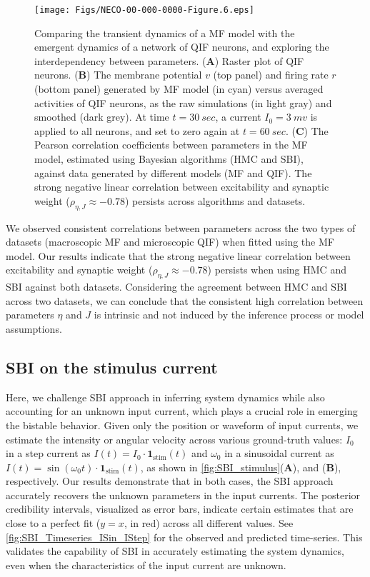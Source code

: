 \documentclass[12pt]{article}
\begin{document}
\begin{figure}
     \centering
     \texttt{[image: Figs/NECO-00-000-0000-Figure.6.eps]}
     \caption{Comparing the transient dynamics of a MF model with the emergent dynamics of a network of QIF neurons, and exploring the interdependency between parameters. (\textbf{A}) Raster plot of QIF neurons. (\textbf{B}) The membrane potential $v$ (top panel) and firing rate $r$ (bottom panel) generated by MF model (in cyan) versus averaged activities of QIF neurons, as the raw simulations (in light gray) and smoothed (dark grey). At time $t=30~sec$, a current $I_0=3~ mv$ is applied to all neurons, and set to zero again at $t=60~sec$. (\textbf{C}) The Pearson correlation coefficients between parameters in the MF model, estimated using Bayesian algorithms (HMC and SBI), against data generated by different models (MF and QIF). The strong negative linear correlation between excitability and synaptic weight ($\rho_{\eta, J} \approx -0.78$) persists across algorithms and datasets.}
     \label{fig:QIF_correlations}
 \end{figure}
 
We observed consistent correlations between parameters across the two types of datasets (macroscopic MF and microscopic QIF) when fitted using the MF model. Our results indicate that the strong negative linear correlation between excitability and synaptic weight ($\rho_{\eta, J} \approx -0.78$) persists when using HMC and SBI against both datasets. Considering the agreement between HMC and SBI across two datasets, we can conclude that the consistent high correlation between parameters $\eta$ and $J$ is intrinsic and not induced by the inference process or model assumptions.


\subsection{SBI on the stimulus current}

Here, we challenge SBI approach in inferring system dynamics while also accounting for an unknown input current, which plays a crucial role in emerging the bistable behavior. Given only the position or waveform of input currents, we estimate the intensity or angular velocity across various ground-truth values: $I_0$ in a step current as $I(t)=I_0 \cdot \mathbf{1}_{\text{stim}}(t)$ and $\omega_0$ in a sinusoidal current as $I(t)=\sin (\omega_0 t) \cdot \mathbf{1}_{\text{stim}}(t)$, as shown in \autoref{fig:SBI_stimulus}(\textbf{A}), and (\textbf{B}), respectively. 
Our results demonstrate that in both cases, the SBI approach accurately recovers the unknown parameters in the input currents. The posterior credibility intervals, visualized as error bars, indicate certain estimates that are close to a perfect fit ($y=x$, in red) across all different values. See \autoref{fig:SBI_Timeseries_ISin_IStep} for the observed and predicted time-series. This validates the capability of SBI in accurately estimating the system dynamics, even when the characteristics of the input current are unknown.
\end{document}
